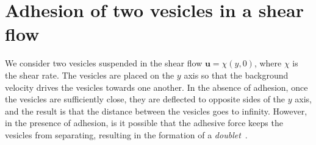 \documentclass[aps,prl,twocolumn,showpacs,amsmath,amssymb]{revtex4-1}
\newcommand{\uu}{\mathbf{u}}
\begin{document}
%
%



\newpage %
\section{Adhesion of two vesicles in a shear flow}
\label{sec:sflow} 
We consider two vesicles suspended in the shear flow $\uu = \chi(y,0)$,
where $\chi$ is the shear rate.  The vesicles are placed on the $y$ axis
so that the background velocity drives the vesicles towards one another.
In the absence of adhesion, once the vesicles are sufficiently close,
they are deflected to opposite sides of the $y$ axis, and the result is
that the distance between the vesicles goes to infinity.  However, in
the presence of adhesion, is it possible that the adhesive force keeps
the vesicles from separating, resulting in the formation of a {\em
doublet}~\cite{}.
\end{document}
